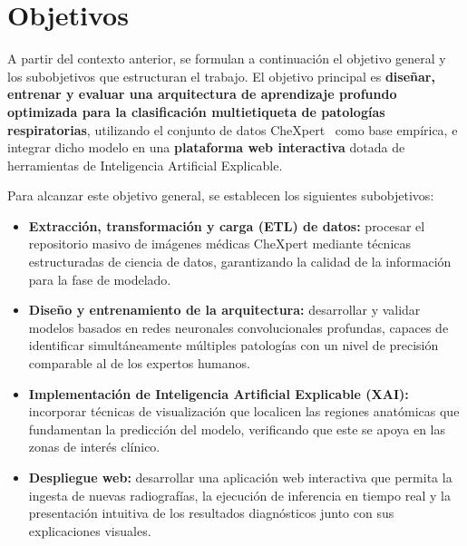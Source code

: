 \section{Objetivos}

A partir del contexto anterior, se formulan a continuación el objetivo general y
los subobjetivos que estructuran el trabajo. El objetivo principal es
\textbf{diseñar, entrenar y evaluar una arquitectura de aprendizaje profundo
optimizada para la clasificación multietiqueta de patologías respiratorias},
utilizando el conjunto de datos CheXpert~\cite{irvinCheXpertLargeChest2019} como
base empírica, e integrar dicho modelo en una \textbf{plataforma web interactiva}
dotada de herramientas de Inteligencia Artificial Explicable.

Para alcanzar este objetivo general, se establecen los siguientes subobjetivos:

\begin{itemize}
  \item \textbf{Extracción, transformación y carga (ETL) de datos:} procesar el
        repositorio masivo de imágenes médicas CheXpert mediante técnicas
        estructuradas de ciencia de datos, garantizando la calidad de la
        información para la fase de modelado.

  \item \textbf{Diseño y entrenamiento de la arquitectura:} desarrollar y
        validar modelos basados en redes neuronales convolucionales profundas,
        capaces de identificar simultáneamente múltiples patologías con un nivel
        de precisión comparable al de los expertos humanos.

  \item \textbf{Implementación de Inteligencia Artificial Explicable (XAI):}
        incorporar técnicas de visualización que localicen las regiones
        anatómicas que fundamentan la predicción del modelo, verificando que
        este se apoya en las zonas de interés clínico.

  \item \textbf{Despliegue web:} desarrollar una aplicación web interactiva que
        permita la ingesta de nuevas radiografías, la ejecución de inferencia en
        tiempo real y la presentación intuitiva de los resultados diagnósticos
        junto con sus explicaciones visuales.
\end{itemize}
